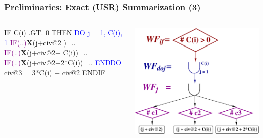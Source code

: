 \documentclass{beamer}
\newcommand{\blue}[1]{\textcolor{Blue}{{#1}}}
\newcommand{\purple}[1]{\textcolor{Purple}{{#1}}}
\newcommand{\emp}[1]{\textcolor{DikuRed}{ #1}}
\begin{document}
\begin{frame}[fragile,t]
\frametitle{Preliminaries: Exact (USR) Summarization (3)}

\begin{columns}
\begin{colorcode}[fontsize=\small]
 \emp{IF C(i) .GT. 0 THEN}
  \blue{DO j = 1, C(i), 1}
   \purple{IF(..)}{\bf{}X}(j+civ@2       )=..
   \purple{IF(..)}{\bf{}X}(j+civ@2+  C(i))=..
   \purple{IF(..)}{\bf{}X}(j+civ@2+2*C(i))=..
  \blue{ENDDO}
  civ@3 = 3*C(i) + civ@2
 \emp{ENDIF}
\end{colorcode}
\includegraphics[height=39ex]{Figures/WFif_USR}
\end{columns}

\end{frame}
\end{document}
